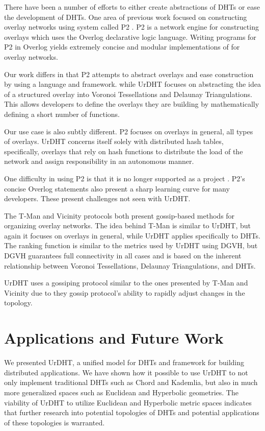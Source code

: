 There have been a number of efforts to either create abstractions of DHTs or ease the development of DHTs.
One area of previous work focused on constructing overlay networks using system called P2 \cite{p2} \cite{loo2005implementing}.
P2 is a network engine for constructing overlays which uses the Overlog declarative logic language.
Writing programs for P2 in Overlog yields extremely concise and modular implementations of for overlay networks. 

Our work differs in that P2 attempts to abstract overlays and ease construction by using a language and framework. while UrDHT focuses on abstracting the idea of a structured overlay into Voronoi Tessellations and Delaunay Triangulations.
This allows developers to define the overlays they are building by mathematically defining a short number of functions.

Our use case is also subtly different. 
P2 focuses on overlays in general, all types of overlays.
UrDHT concerns itself solely with distributed hash tables, specifically, overlays that rely on hash functions to distribute the load of the network and assign responsibility in an autonomous manner. 

One difficulty in using P2 is that it is no longer supported as a project \cite{p2}. 
P2's concise Overlog statements also present a sharp learning curve for many developers.
These present challenges not seen with UrDHT.


The T-Man\cite{jelasity2005t} and Vicinity \cite{voulgaris2005epidemic} protocols both present gossip-based methods for organizing overlay networks.
The idea behind T-Man is similar to UrDHT, but again it focuses on overlays in general, while UrDHT applies specifically to DHTs.
The ranking function is similar to the metrics used by UrDHT using DGVH, but DGVH guarantees full connectivity in all cases and is based on the inherent relationship between Voronoi Tessellations, Delaunay Triangulations, and DHTs.

UrDHT uses a gossiping protocol similar to the ones presented by T-Man and Vicinity due to they gossip protocol's ability to rapidly adjust changes in the topology.


\section{Applications and Future Work}
\label{sec:future}

We presented UrDHT, a unified model for DHTs and framework for building distributed applications.
We have shown how it possible to use UrDHT to not only implement traditional DHTs such as Chord and Kademlia, but also in much more generalized spaces such as Euclidean and Hyperbolic geometries.
The viability of UrDHT to utilize Euclidean and Hyperbolic metric spaces indicates that further research into potential topologies of DHTs and potential applications of these topologies is warranted.



